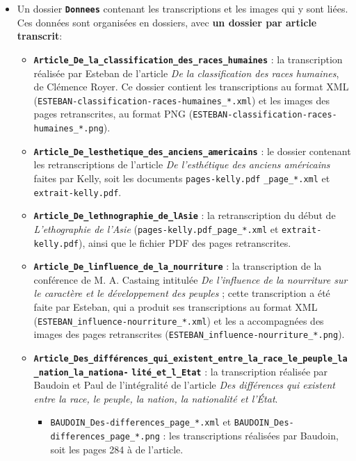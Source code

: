 \documentclass{article}
\begin{document}
	\begin{itemize}
		\item Un dossier \textbf{ \texttt{Donnees}} contenant les transcriptions et les images qui y sont liées. Ces données sont organisées en dossiers, avec \textbf{un dossier par article transcrit}:
		\begin{itemize}
			\item \textbf{\texttt{Article\_De\_la\_classification\_des\_races\_humaines}} : la transcription réalisée par Esteban de l'article \textit{De la classification des races humaines}, de Clémence Royer. Ce dossier contient les transcriptions au format XML (\texttt{ESTEBAN-classification-races-humaines\_*.xml}) et les images des pages retranscrites, au format PNG (\texttt{ESTEBAN-classification-races-humaines\_*.png}).
			\item \textbf{\texttt{Article\_De\_lesthetique\_des\_anciens\_americains}} : le dossier contenant les retranscriptions de l'article \textit{De l'esthétique des anciens américains} faites par Kelly, soit les documents \texttt{pages-kelly.pdf}
			\noindent \texttt{\_page\_*.xml} et \texttt{extrait-kelly.pdf}.
			\item \textbf{\texttt{Article\_De\_lethnographie\_de\_lAsie}} : la retranscription du début de \textit{L'ethographie de l'Asie} (\texttt{pages-kelly.pdf\_page\_*.xml} et \texttt{extrait-kelly.pdf}), ainsi que le fichier PDF des pages retranscrites.
			\item \textbf{\texttt{Article\_De\_linfluence\_de\_la\_nourriture}} : la transcription de la conférence de M. A. Castaing intitulée \textit{De l'influence de la nourriture sur le caractère et le développement des peuples} ; cette transcription a été faite par Esteban, qui a produit ses transcriptions au format XML (\texttt{ESTEBAN\_influence-nourriture\_*.xml}) et les a accompagnées des images des pages retranscrites (\texttt{ESTEBAN\_influence-nourriture\_*.png}).
			\item \textbf{\texttt{Article\_Des\_différences\_qui\_existent\_entre\_la\_race\_le\_peuple\_la\_nation\_la\_nationa-}}
			\noindent \textbf{\texttt{lité\_et\_l\_Etat}} : la transcription réalisée par Baudoin et Paul de l'intégralité de l'article \textit{Des différences qui existent entre la race, le peuple, la nation, la nationalité et l'État}.
			\begin{itemize}
				\item \texttt{BAUDOIN\_Des-differences\_page\_*.xml} et \texttt{BAUDOIN\_Des-differences\_page\_*.png} : les transcriptions réalisées par Baudoin, soit les pages 284 à de l'article.

\end{itemize}
\end{itemize}
\end{itemize}
\end{document}
